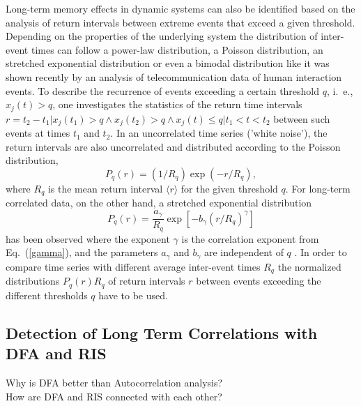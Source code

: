 \documentclass[a4paper,10pt]{scrbook}
\begin{document}
Long-term memory effects in dynamic systems can also be identified based on the 
analysis of return intervals between extreme events that exceed a given threshold. 
Depending on the properties of the underlying system the distribution of inter-event times
can follow a power-law distribution, a Poisson distribution, an stretched exponential distribution or even a bimodal 
distribution like it was shown recently by an analysis of telecommunication data \cite{Wu.2010} of human interaction events.
To describe the recurrence of events exceeding a certain threshold $q$,
i.~e., $x_{j}(t)>q$, one investigates the statistics of the return time intervals 
$r = t_2 - t_1 \vert x_{j}(t_1)>q \wedge x_{j}(t_2)>q \wedge x_{j}(t)\le q \vert t_1 < t < t_2$ 
between such events at times $t_1$ and $t_2$. 
In an uncorrelated time series ('white noise'), the return intervals are also uncorrelated and distributed according 
to the Poisson distribution, 
%
\begin{equation}
P_{q}(r)=(1/R_{q})\exp (-r/R_{q}),  \label{simple}
\end{equation}%
%
where $R_{q}$ is the mean return interval $\langle r \rangle$ for the given threshold $q$. For long-term correlated data, 
on the other hand, a stretched exponential distribution 
%
\begin{equation}
P_{q}(r)={\frac{a_{\gamma }}{R_{q}}}\exp [-b_{\gamma }(r/R_{q})^{\gamma }]
\label{stretched}
\end{equation}%
%
has been observed \cite{Bunde.2003,Bunde.2005,Altmann.2005,Eichner.2007,Ivanov.2004} 
where the exponent $\gamma$ is the correlation exponent from Eq.~(\ref{gamma}), and 
the parameters $a_{\gamma }$ and $b_{\gamma }$ are independent of $q$ \cite{Altmann.2005,Eichner.2007}.
In order to compare time series with different average inter-event times $R_q$ the 
normalized distributions $P_q(r) R_q$ of return intervals $r$
between events exceeding the different thresholds $q$ have to be used.






\subsection{Detection of Long Term Correlations with DFA and RIS}

Why is DFA better than Autocorrelation analysis?\\

How are DFA and RIS connected with each other?\\
\end{document}
